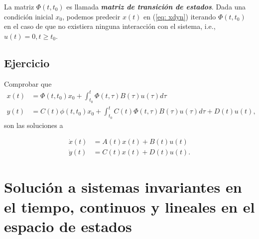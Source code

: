 La matriz $\Phi(t,t_0)$ es llamada \textbf{\emph{matriz de transición de estados}}. Dada una condición inicial $x_0$, podemos predecir $x(t)$ en (\ref{eq: xdyn}) iterando $\Phi(t,t_0)$ en el caso de que no existiera ninguna interacción con el sistema, i.e., $u(t) = 0, t\geq t_0$.

\subsection{Ejercicio}
Comprobar que
\begin{align}
	x(t) &= \Phi(t,t_0)x_0 + \int_{t_0}^t \Phi(t,\tau)B(\tau)u(\tau)d\tau  \label{eq: solx} \\
	y(t) &= C(t)\phi(t,t_0)x_0 + \int_{t_0}^t C(t)\Phi(t,\tau)B(\tau)u(\tau)d\tau + D(t)u(t), \label{eq: soly}
\end{align}
son las soluciones a

\begin{align}
	\dot x(t) &= A(t)x(t) + B(t)u(t)  \nonumber \\
	\dot y(t) &= C(t)x(t) + D(t)u(t).  \nonumber
\end{align}

\section{Solución a sistemas invariantes en el tiempo, continuos y lineales en el espacio de estados}

